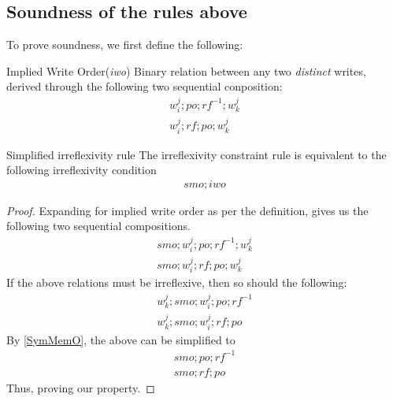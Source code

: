 \subsection{Soundness of the rules above}

    To prove soundness, we first define the following: 

    \begin{definition}{Implied Write Order(\emph{iwo})}
        \label{ImpliedW}
        Binary relation between any two \emph{distinct} writes, derived through the following two sequential conposition:  
        \begin{align*}
            w_i^j;po;rf^{-1};w_k^j \\
            w_i^j;rf;po;w_k^j 
        \end{align*}
    \end{definition}


    \begin{property}{Simplified irreflexivity rule}
        \label{prop1}
        The irreflexivity constraint rule is equivalent to the following irreflexivity condition 
        \begin{align}
            smo;iwo
        \end{align}
    \end{property}

    \begin{proof}
        Expanding for implied write order as per the definition, gives us the following two sequential compositions. 
        \begin{align}
            smo;w_i^j;po;rf^{-1};w_k^j \\
            smo;w_i^j;rf;po;w_k^j 
        \end{align}
        If the above relations must be irreflexive, then so should the following: 
        \begin{align}
            w_k^j;smo;w_i^j;po;rf^{-1} \\
            w_k^j;smo;w_i^j;rf;po     
        \end{align}
        By \ref{SymMemO}, the above can be simplified to
        \begin{align}
            smo;po;rf^{-1} \\
            smo;rf;po 
        \end{align}
        Thus, proving our property. 
    \end{proof}

